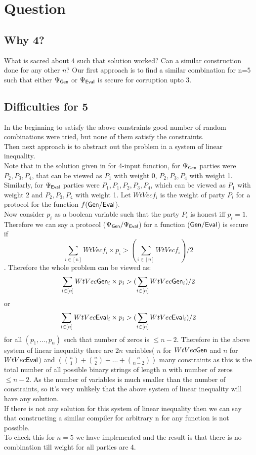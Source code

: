 \section{Question}
\subsection{Why 4?}
What is sacred about 4 such that solution worked? Can a similar construction done for any other $n$? Our first approach is to find a similar combination for n=5 such that either $\Psi_{\mathsf{Gen}}$ or $\Psi_{\mathsf{Eval}}$ is secure for corruption upto 3.
\subsection{Difficulties for 5}
In the beginning to satisfy the above constraints good number of random combinations were tried, but none of them satisfy the constraints.\\ %
Then next approach is to abstract out the problem in a system of linear inequality.\\
Note that in the solution given in \cite{BITMPC} for 4-input function, for $\Psi_{\mathsf{Gen}}$ parties were $P_2,P_3,P_4$, that can be viewed as $P_1$ with weight 0, $P_2,P_3,P_4$ with weight 1. Similarly, for $\Psi_{\mathsf{Eval}}$ parties were $P_1, P_1, P_2,P_3,P_4$, which can be viewed as $P_1$ with weight 2 and $P_2,P_3,P_4$ with weight 1. Let $WtVecf_i$ is the weight of party $P_i$ for a protocol for the function $f(\mathsf{Gen}/\mathsf{Eval}$).\\
Now consider $p_i$ as a boolean variable such that the party $P_i$ is honest iff $p_i=1$. Therefore we can say a protocol ($\Psi_{\mathsf{Gen}}/\Psi_{\mathsf{Eval}}$) for a function ($\mathsf{Gen} /\mathsf{Eval}$) is secure if 
$$ \sum_{i\in[n]} WtVecf_i \times p_i > (\sum_{i\in[n]} WtVecf_i)/2$$.
Therefore the whole problem can be viewed as:
$$ \sum_{i\in[n]} WtVec\mathsf{Gen}_i \times p_i > (\sum_{i\in[n]} WtVec\mathsf{Gen}_i)/2$$ or
$$ \sum_{i\in[n]} WtVec\mathsf{Eval}_i \times p_i > (\sum_{i\in[n]} WtVec\mathsf{Eval}_i)/2$$
for all $(p_1,\ldots, p_n)$ such that number of zeros is $\leq n-2$.
Therefore in the above system of linear inequality there are $2n$ variables( $n$ for $WtVec\mathsf{Gen}$ and $n$ for $WtVec\mathsf{Eval}$) and $(\binom{n}{1} + \binom{n}{2} +  \ldots + \binom{n}{n-2})$ many constraints as this is the total number of all possible binary strings of length $n$ with number of zeros $\leq n-2$.
As the number of variables is much smaller than the number of constraints, so it's very unlikely that the above system of linear inequality will have any solution.\\
If there is not any solution for this system of linear inequality then we can say that constructing a similar compiler for arbitrary n for any function is not possible.\\
To check this for $n=5$ we have implemented and the result is that there is no combination till weight for all parties are 4.